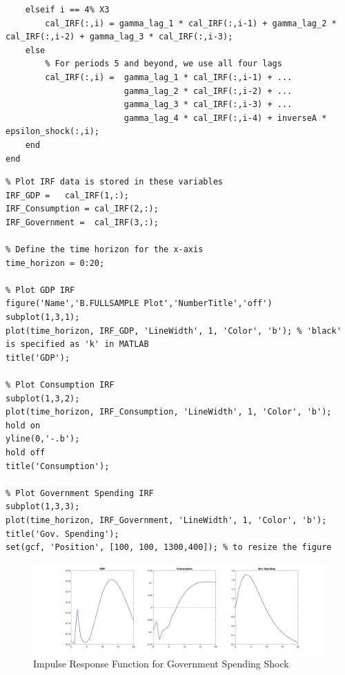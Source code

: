 \documentclass{article}
\begin{document}
\begin{CJK}{UTF8}{gbsn}
\begin{lstlisting}
    elseif i == 4% X3
        cal_IRF(:,i) = gamma_lag_1 * cal_IRF(:,i-1) + gamma_lag_2 * cal_IRF(:,i-2) + gamma_lag_3 * cal_IRF(:,i-3);
    else
        % For periods 5 and beyond, we use all four lags
        cal_IRF(:,i) =  gamma_lag_1 * cal_IRF(:,i-1) + ...
                        gamma_lag_2 * cal_IRF(:,i-2) + ...
                        gamma_lag_3 * cal_IRF(:,i-3) + ...
                        gamma_lag_4 * cal_IRF(:,i-4) + inverseA * epsilon_shock(:,i);
    end
end
\end{lstlisting}



\begin{lstlisting}
% Plot IRF data is stored in these variables
IRF_GDP =   cal_IRF(1,:); 
IRF_Consumption = cal_IRF(2,:); 
IRF_Government =  cal_IRF(3,:); 

% Define the time horizon for the x-axis
time_horizon = 0:20; 

% Plot GDP IRF
figure('Name','B.FULLSAMPLE Plot','NumberTitle','off') 
subplot(1,3,1);
plot(time_horizon, IRF_GDP, 'LineWidth', 1, 'Color', 'b'); % 'black' is specified as 'k' in MATLAB
title('GDP');

% Plot Consumption IRF
subplot(1,3,2);
plot(time_horizon, IRF_Consumption, 'LineWidth', 1, 'Color', 'b'); 
hold on 
yline(0,'-.b');
hold off 
title('Consumption');

% Plot Government Spending IRF
subplot(1,3,3);
plot(time_horizon, IRF_Government, 'LineWidth', 1, 'Color', 'b');
title('Gov. Spending');
set(gcf, 'Position', [100, 100, 1300,400]); % to resize the figure
\end{lstlisting}

\begin{figure}[!h]
    \centering
    \includegraphics[width=1\linewidth]{Qb_1.jpg}
    \caption{Impulse Response Function for Government Spending Shock}
    \label{fig:enter-label}
\end{figure}

\end{CJK}
\end{document}

